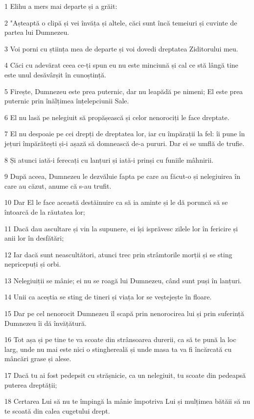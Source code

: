 \par 1 Elihu a mers mai departe și a grăit:
\par 2 "Așteaptă o clipă și vei învăța și altele, căci sunt încă temeiuri și cuvinte de partea lui Dumnezeu.
\par 3 Voi porni cu știința mea de departe și voi dovedi dreptatea Ziditorului meu.
\par 4 Căci cu adevărat ceea ce-ți spun eu nu este minciună și cal ce stă lângă tine este unul desăvârșit în cunoștință.
\par 5 Firește, Dumnezeu este prea puternic, dar nu leapădă pe nimeni; El este prea puternic prin înălțimea înțelepciunii Sale.
\par 6 El nu lasă pe nelegiuit să propășească și celor nenorociți le face dreptate.
\par 7 El nu despoaie pe cei drepți de dreptatea lor, iar cu împărații la fel: îi pune în jețuri împărătești și-i așază să domnească de-a pururi. Dar ei se umflă de trufie.
\par 8 Și atunci iată-i ferecați cu lanțuri și iată-i prinși cu funiile mâhnirii.
\par 9 După aceea, Dumnezeu le dezvăluie fapta pe care au făcut-o și nelegiuirea în care au căzut, anume că s-au trufit.
\par 10 Dar El le face această destăinuire ca să ia aminte și le dă poruncă să se întoarcă de la răutatea lor;
\par 11 Dacă dau ascultare și vin la supunere, ei își isprăvesc zilele lor în fericire și anii lor în desfătări;
\par 12 Iar dacă sunt neascultători, atunci trec prin strâmtorile morții și se sting nepricepuți și orbi.
\par 13 Nelegiuiții se mânie; ei nu se roagă lui Dumnezeu, când sunt puși în lanțuri.
\par 14 Unii ca aceștia se sting de tineri și viața lor se veștejește în floare.
\par 15 Dar pe cel nenorocit Dumnezeu îl scapă prin nenorocirea lui și prin suferință Dumnezeu îi dă învățătură.
\par 16 Tot așa și pe tine te va scoate din strânsoarea durerii, ca să te pună la loc larg, unde nu mai este nici o stinghereală și unde masa ta va fi încărcată cu mâncări grase și alese.
\par 17 Dacă tu ai fost pedepsit cu strășnicie, ca un nelegiuit, tu scoate din pedeapsă puterea dreptății;
\par 18 Certarea Lui să nu te împingă la mânie împotriva Lui și mulțimea bătăii să nu te scoată din calea cugetului drept.
